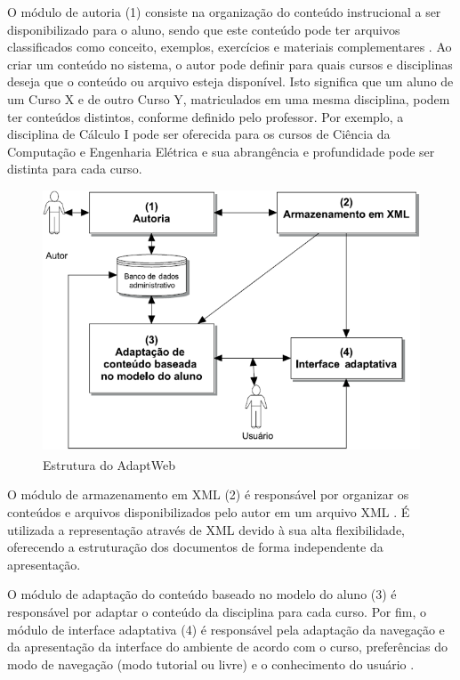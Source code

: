O módulo de autoria (1) consiste na organização do conteúdo instrucional a ser disponibilizado para o aluno, sendo que
este conteúdo pode ter arquivos classificados como conceito, exemplos, exercícios e materiais complementares
\cite{gasparini2003interface}. Ao criar um conteúdo no sistema, o autor pode definir para quais cursos e disciplinas
deseja que o conteúdo ou arquivo esteja disponível. Isto significa que um aluno de um Curso X e de outro Curso Y,
matriculados em uma mesma disciplina, podem ter conteúdos distintos, conforme definido pelo professor. Por exemplo, a
disciplina de Cálculo I pode ser oferecida para os cursos de Ciência da Computação e Engenharia Elétrica e sua
abrangência e profundidade pode ser distinta para cada curso.

\begin{figure}[htb]
  \caption{\label{fig:adaptweb-arquitetura}Estrutura do AdaptWeb\textsuperscript{\textregistered}}
  \begin{center}
      \includegraphics[scale=1.0]{./Figuras/adaptweb-arquitetura.png}
  \end{center}
\end{figure}

O módulo de armazenamento em XML (2) é responsável por organizar os conteúdos e arquivos disponibilizados pelo autor em
um arquivo XML \cite{gasparini2003interface}. É utilizada a representação através de XML devido à sua alta
flexibilidade, oferecendo a estruturação dos documentos de forma independente da apresentação.

O módulo de adaptação do conteúdo baseado no modelo do aluno (3) é responsável por adaptar o conteúdo da disciplina
para cada curso. Por fim, o módulo de interface adaptativa (4) é responsável pela adaptação da navegação e da
apresentação da interface do ambiente de acordo com o curso, preferências do modo de navegação (modo tutorial ou livre)
e o conhecimento do usuário \cite{gasparini2003interface}.

